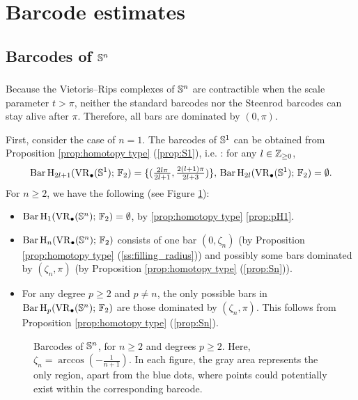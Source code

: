 
\section{Barcode estimates}\label{s:computations}

\subsection{Barcodes of $\mathbb{S}^n$}\label{ss:Sn}

\subsubsection{}

Because the Vietoris--Rips complexes of $\mathbb{S}^n$ are contractible when the scale parameter $t>\pi$, neither the standard barcodes nor the Steenrod barcodes can stay alive after $\pi$.
Therefore, all bars are dominated by $(0,\pi)$.

First, consider the case of $n=1$.
The barcodes of $\mathbb{S}^1$ can be obtained from Proposition \ref{prop:homotopy type} (\ref{prop:S1}), i.e. \cite[Theorem~7.4]{adamaszek2017vietoris}: for any $l \in \mathbb{Z}_{\geq 0}$,
\begin{equation}\label{eq:barc of S1}
	\operatorname{Bar} \operatorname{H}_{2l+1}(\operatorname{VR}_\bullet(\mathbb{S}^1);\,{\mathbb{F}_2})=\{(\tfrac{2l\pi}{2l+1},\tfrac{2(l+1)\pi}{2l+3})\},\, \operatorname{Bar} \operatorname{H}_{2l}(\operatorname{VR}_\bullet(\mathbb{S}^1);\,{\mathbb{F}_2})=\emptyset.
\end{equation}
For $n\geq 2$, we have the following (see Figure \ref{fig:Sk}):
\begin{itemize}
	\item $\operatorname{Bar} \operatorname{H}_{1}(\operatorname{VR}_\bullet(\mathbb{S}^n);\,{\mathbb{F}_2}) = \emptyset$, by \cref{prop:homotopy type} \cref{prop:pH1}.
	\item $\operatorname{Bar} \operatorname{H}_{n}(\operatorname{VR}_\bullet(\mathbb{S}^n);\,{\mathbb{F}_2})$ consists of one bar $(0,\zeta_n)$ (by Proposition \ref{prop:homotopy type} (\ref{ss:filling_radius})) and possibly some bars dominated by $(\zeta_n,\pi)$ (by Proposition \ref{prop:homotopy type} (\ref{prop:Sn})).
	\item For any degree $p\geq 2$ and $p\neq n$, the only possible bars in $\operatorname{Bar} \operatorname{H}_{p}(\operatorname{VR}_\bullet(\mathbb{S}^n);\,{\mathbb{F}_2})$ are those dominated by $(\zeta_n,\pi)$.
	This follows from Proposition \ref{prop:homotopy type} (\ref{prop:Sn}).
\end{itemize}

\begin{figure}[ht]
	\centering
	
	\caption{Barcodes of $\mathbb{S}^n$, for $n\geq 2$ and degrees $p\geq 2$.
		Here, $\zeta_n=\arccos(-\frac{1}{n+1})$.
		In each figure, the gray area represents the only region, apart from the blue dots, where points could potentially exist within the corresponding barcode.}
	\label{fig:Sk}
\end{figure}

